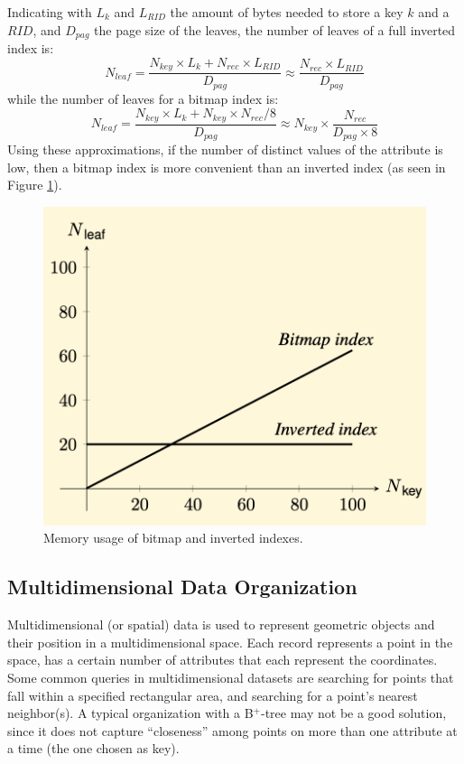 Indicating with $L_k$ and $L_{RID}$ the amount of bytes needed to store a key $k$ and a $RID$, and $D_{pag}$ the page size of the leaves, the number of leaves of a full inverted index is:
\begin{equation*}
    N_{leaf} = \dfrac{N_{key} \times L_k + N_{rec} \times L_{RID}}{D_{pag}} \approx \dfrac{N_{rec} \times L_{RID}}{D_{pag}}
\end{equation*}
while the number of leaves for a bitmap index is:
\begin{equation*}
    N_{leaf} = \dfrac{N_{key} \times L_k + N_{key} \times N_{rec}/8}{D_{pag}} \approx N_{key} \times \dfrac{N_{rec}}{D_{pag} \times 8}
\end{equation*}
Using these approximations, if the number of distinct values of the attribute is low, then a bitmap index is more convenient than an inverted index (as seen in Figure \ref{fig:bitmap-vs-inverted}). 

\begin{figure}[ht]
    \centering
    \includegraphics[width=0.5\linewidth]{img/bitmap_vs_inverted.png}
    \caption{Memory usage of bitmap and inverted indexes.}
    \label{fig:bitmap-vs-inverted}
\end{figure}

\subsection{Multidimensional Data Organization}

Multidimensional (or spatial) data is used to represent geometric objects and their position in a multidimensional space. Each record represents a point in the space, has a certain number of attributes that each represent the coordinates. Some common queries in multidimensional datasets are searching for points that fall within a specified rectangular area, and searching for a point's nearest neighbor(s). A typical organization with a B$^+$-tree may not be a good solution, since it does not capture ``closeness'' among points on more than one attribute at a time (the one chosen as key).

